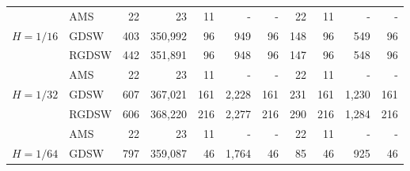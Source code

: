 \begin{table}[H]
\begin{tabular}{llrrrrrrrrr}
\cline{2-11}
\bfseries  & AMS & 22 & {\cellcolor[HTML]{768BEC}} \color[HTML]{F1F1F1} 23 & 11 & {\cellcolor[HTML]{ACB8F4}} \color[HTML]{000000} {\cellcolor[HTML]{E2E4FB}} - & - & {\cellcolor[HTML]{405FE5}} \color[HTML]{F1F1F1} 22 & 11 & {\cellcolor[HTML]{E2E4FB}} \color[HTML]{000000} {\cellcolor[HTML]{E2E4FB}} - & - \\
\cline{1-11} \cline{2-11}
\multirow[c]{3}{*}{\bfseries $H=1/16$} & GDSW & 403 & {\cellcolor[HTML]{E2E4FB}} \color[HTML]{000000} 350,992 & 96 & {\cellcolor[HTML]{ACB8F4}} \color[HTML]{000000} 949 & 96 & {\cellcolor[HTML]{768BEC}} \color[HTML]{F1F1F1} 148 & 96 & {\cellcolor[HTML]{405FE5}} \color[HTML]{F1F1F1} 549 & 96 \\
\cline{2-11}
\bfseries  & RGDSW & 442 & {\cellcolor[HTML]{E2E4FB}} \color[HTML]{000000} 351,891 & 96 & {\cellcolor[HTML]{ACB8F4}} \color[HTML]{000000} 948 & 96 & {\cellcolor[HTML]{768BEC}} \color[HTML]{F1F1F1} 147 & 96 & {\cellcolor[HTML]{405FE5}} \color[HTML]{F1F1F1} 548 & 96 \\
\cline{2-11}
\bfseries  & AMS & 22 & {\cellcolor[HTML]{768BEC}} \color[HTML]{F1F1F1} 23 & 11 & {\cellcolor[HTML]{ACB8F4}} \color[HTML]{000000} {\cellcolor[HTML]{E2E4FB}} - & - & {\cellcolor[HTML]{405FE5}} \color[HTML]{F1F1F1} 22 & 11 & {\cellcolor[HTML]{E2E4FB}} \color[HTML]{000000} {\cellcolor[HTML]{E2E4FB}} - & - \\
\cline{1-11} \cline{2-11}
\multirow[c]{3}{*}{\bfseries $H=1/32$} & GDSW & 607 & {\cellcolor[HTML]{E2E4FB}} \color[HTML]{000000} 367,021 & 161 & {\cellcolor[HTML]{ACB8F4}} \color[HTML]{000000} 2,228 & 161 & {\cellcolor[HTML]{405FE5}} \color[HTML]{F1F1F1} 231 & 161 & {\cellcolor[HTML]{768BEC}} \color[HTML]{F1F1F1} 1,230 & 161 \\
\cline{2-11}
\bfseries  & RGDSW & 606 & {\cellcolor[HTML]{E2E4FB}} \color[HTML]{000000} 368,220 & 216 & {\cellcolor[HTML]{ACB8F4}} \color[HTML]{000000} 2,277 & 216 & {\cellcolor[HTML]{405FE5}} \color[HTML]{F1F1F1} 290 & 216 & {\cellcolor[HTML]{768BEC}} \color[HTML]{F1F1F1} 1,284 & 216 \\
\cline{2-11}
\bfseries  & AMS & 22 & {\cellcolor[HTML]{768BEC}} \color[HTML]{F1F1F1} 23 & 11 & {\cellcolor[HTML]{ACB8F4}} \color[HTML]{000000} {\cellcolor[HTML]{E2E4FB}} - & - & {\cellcolor[HTML]{405FE5}} \color[HTML]{F1F1F1} 22 & 11 & {\cellcolor[HTML]{E2E4FB}} \color[HTML]{000000} {\cellcolor[HTML]{E2E4FB}} - & - \\
\cline{1-11} \cline{2-11}
\multirow[c]{3}{*}{\bfseries $H=1/64$} & GDSW & 797 & {\cellcolor[HTML]{E2E4FB}} \color[HTML]{000000} 359,087 & 46 & {\cellcolor[HTML]{ACB8F4}} \color[HTML]{000000} 1,764 & 46 & {\cellcolor[HTML]{768BEC}} \color[HTML]{F1F1F1} 85 & 46 & {\cellcolor[HTML]{405FE5}} \color[HTML]{F1F1F1} 925 & 46 \\

\end{tabular}
\end{table}
